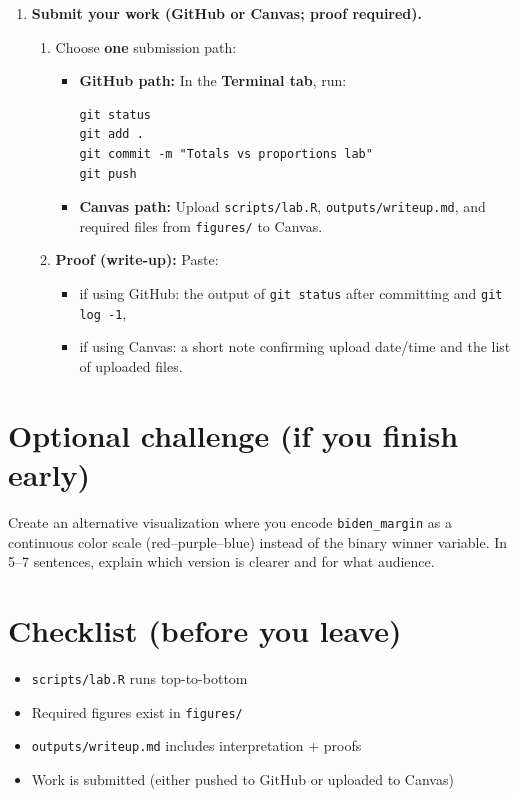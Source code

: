 \documentclass[11pt]{article}
\begin{document}
\begin{enumerate}
  \item \textbf{Submit your work (GitHub or Canvas; proof required).}
  \begin{enumerate}
    \item Choose \textbf{one} submission path:
    \begin{itemize}
      \item \textbf{GitHub path:} In the \textbf{Terminal tab}, run:
\begin{verbatim}
git status
git add .
git commit -m "Totals vs proportions lab"
git push
\end{verbatim}
      \item \textbf{Canvas path:} Upload \texttt{scripts/lab.R}, \texttt{outputs/writeup.md}, and required files from \texttt{figures/} to Canvas.
    \end{itemize}
    \item \textbf{Proof (write-up):} Paste:
    \begin{itemize}
      \item if using GitHub: the output of \texttt{git status} after committing and \texttt{git log -1},
      \item if using Canvas: a short note confirming upload date/time and the list of uploaded files.
    \end{itemize}
  \end{enumerate}

\end{enumerate}

\section*{Optional challenge (if you finish early)}
Create an alternative visualization where you encode \texttt{biden\_margin} as a continuous color scale (red--purple--blue) instead of the binary winner variable. In 5--7 sentences, explain which version is clearer and for what audience.

\section*{Checklist (before you leave)}
\begin{itemize}
  \item \texttt{scripts/lab.R} runs top-to-bottom
  \item Required figures exist in \texttt{figures/}
  \item \texttt{outputs/writeup.md} includes interpretation + proofs
  \item Work is submitted (either pushed to GitHub or uploaded to Canvas)
\end{itemize}
\end{document}
